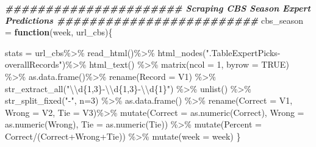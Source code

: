 \documentclass[
]{article}
\newenvironment{Shaded}{\begin{snugshade}}{\end{snugshade}}
\newcommand{\AttributeTok}[1]{\textcolor[rgb]{0.77,0.63,0.00}{#1}}
\newcommand{\ConstantTok}[1]{\textcolor[rgb]{0.00,0.00,0.00}{#1}}
\newcommand{\ControlFlowTok}[1]{\textcolor[rgb]{0.13,0.29,0.53}{\textbf{#1}}}
\newcommand{\DecValTok}[1]{\textcolor[rgb]{0.00,0.00,0.81}{#1}}
\newcommand{\DocumentationTok}[1]{\textcolor[rgb]{0.56,0.35,0.01}{\textbf{\textit{#1}}}}
\newcommand{\FunctionTok}[1]{\textcolor[rgb]{0.00,0.00,0.00}{#1}}
\newcommand{\NormalTok}[1]{#1}
\newcommand{\OtherTok}[1]{\textcolor[rgb]{0.56,0.35,0.01}{#1}}
\newcommand{\SpecialCharTok}[1]{\textcolor[rgb]{0.00,0.00,0.00}{#1}}
\newcommand{\StringTok}[1]{\textcolor[rgb]{0.31,0.60,0.02}{#1}}
\begin{document}
\begin{Shaded}
\begin{Highlighting}[]
\DocumentationTok{\#\#\#\#\#\#\#\#\#\#\#\#\#\#\#\#\#\#\#\#\#\# Scraping CBS Season Expert Predictions \#\#\#\#\#\#\#\#\#\#\#\#\#\#\#\#\#\#\#\#\#\#\#\#\#}
\NormalTok{cbs\_season }\OtherTok{=} \ControlFlowTok{function}\NormalTok{(week, url\_cbs)\{}
  
\NormalTok{  stats }\OtherTok{=}\NormalTok{ url\_cbs}\SpecialCharTok{\%\textgreater{}\%}
    \FunctionTok{read\_html}\NormalTok{()}\SpecialCharTok{\%\textgreater{}\%}
    \FunctionTok{html\_nodes}\NormalTok{(}\StringTok{".TableExpertPicks{-}overallRecords"}\NormalTok{)}\SpecialCharTok{\%\textgreater{}\%}
    \FunctionTok{html\_text}\NormalTok{() }\SpecialCharTok{\%\textgreater{}\%} 
    \FunctionTok{matrix}\NormalTok{(}\AttributeTok{ncol =} \DecValTok{1}\NormalTok{, }\AttributeTok{byrow =} \ConstantTok{TRUE}\NormalTok{) }\SpecialCharTok{\%\textgreater{}\%}
    \FunctionTok{as.data.frame}\NormalTok{()}\SpecialCharTok{\%\textgreater{}\%}
    \FunctionTok{rename}\NormalTok{(}\StringTok{\textasciigrave{}}\AttributeTok{Record}\StringTok{\textasciigrave{}} \OtherTok{=}\NormalTok{ V1) }\SpecialCharTok{\%\textgreater{}\%} 
    \FunctionTok{str\_extract\_all}\NormalTok{(}\StringTok{"}\SpecialCharTok{\textbackslash{}\textbackslash{}}\StringTok{d\{1,3\}{-}}\SpecialCharTok{\textbackslash{}\textbackslash{}}\StringTok{d\{1,3\}{-}}\SpecialCharTok{\textbackslash{}\textbackslash{}}\StringTok{d\{1\}"}\NormalTok{) }\SpecialCharTok{\%\textgreater{}\%} 
    \FunctionTok{unlist}\NormalTok{() }\SpecialCharTok{\%\textgreater{}\%} 
    \FunctionTok{str\_split\_fixed}\NormalTok{(}\StringTok{"{-}"}\NormalTok{, }\AttributeTok{n=}\DecValTok{3}\NormalTok{) }\SpecialCharTok{\%\textgreater{}\%} 
    \FunctionTok{as.data.frame}\NormalTok{() }\SpecialCharTok{\%\textgreater{}\%} 
    \FunctionTok{rename}\NormalTok{(}\StringTok{\textasciigrave{}}\AttributeTok{Correct}\StringTok{\textasciigrave{}} \OtherTok{=}\NormalTok{ V1, }\StringTok{\textasciigrave{}}\AttributeTok{Wrong}\StringTok{\textasciigrave{}} \OtherTok{=}\NormalTok{ V2, }\StringTok{\textasciigrave{}}\AttributeTok{Tie}\StringTok{\textasciigrave{}} \OtherTok{=}\NormalTok{ V3)}\SpecialCharTok{\%\textgreater{}\%} 
    \FunctionTok{mutate}\NormalTok{(}\AttributeTok{Correct =} \FunctionTok{as.numeric}\NormalTok{(Correct), }\AttributeTok{Wrong =} \FunctionTok{as.numeric}\NormalTok{(Wrong), }\AttributeTok{Tie =} \FunctionTok{as.numeric}\NormalTok{(Tie)) }\SpecialCharTok{\%\textgreater{}\%} 
    \FunctionTok{mutate}\NormalTok{(}\AttributeTok{Percent =}\NormalTok{ Correct}\SpecialCharTok{/}\NormalTok{(Correct}\SpecialCharTok{+}\NormalTok{Wrong}\SpecialCharTok{+}\NormalTok{Tie)) }\SpecialCharTok{\%\textgreater{}\%} 
    \FunctionTok{mutate}\NormalTok{(}\AttributeTok{week =}\NormalTok{ week)}
\NormalTok{\}}


\end{Highlighting}
\end{Shaded}
\end{document}
